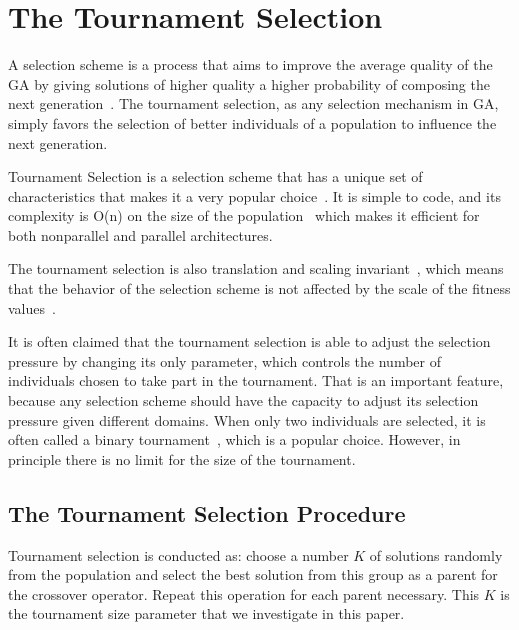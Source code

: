 \section{The Tournament Selection}\label{sec:background:Selection Scheme} 



A selection scheme is a process that aims to improve the average quality of the GA by giving solutions of higher quality a higher probability of composing the next generation~\cite{blickle1995mathematical}.  The tournament selection, as any selection mechanism in GA, simply favors the selection of better individuals of a population to influence the next generation.

Tournament Selection is a selection scheme that has a unique set of characteristics that makes it a very popular choice~\cite{blickle1995mathematical}. It is simple to code, and its complexity is O(n) on the size of the population~\cite{goldberg1991comparative} which makes it efficient for both nonparallel and parallel architectures.

 The tournament selection is also translation and scaling invariant~\cite{maza1993analysis}, which means that the behavior of the selection scheme is not affected by the scale of the fitness values~\cite{back2000evolutionary}.


It is often claimed that the tournament selection is able to adjust the selection pressure by changing its only parameter, which controls the number of individuals chosen to take part in the tournament. That is an important feature, because any selection scheme should have the capacity to adjust its selection pressure given different domains. When only two individuals are selected, it is often called a binary tournament~\cite{blickle1995mathematical, goldberg1991comparative}, which is a popular choice. However, in principle there is no limit for the size of the tournament.

\subsection{The Tournament Selection Procedure}\label{sec:background:tournament_selection} 



Tournament selection is conducted as: choose a number $K$ of solutions randomly from the population and select the best solution from this group as a parent for the crossover operator. Repeat this operation for each parent necessary. This $K$ is the tournament size parameter that we investigate in this paper.




